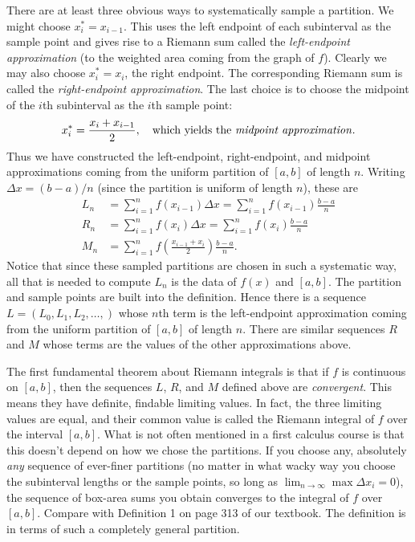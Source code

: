 \documentclass[12pt]{amsart}
\begin{document}
There are at least three obvious ways to systematically sample a partition. We might choose $x^{\ast}_i = x_{i-1}$. This uses the left endpoint of each subinterval as the sample point and gives rise to a Riemann sum called the \emph{left-endpoint approximation} (to the weighted area coming from the graph of $f$). Clearly we may also choose $x^{\ast}_i = x_i$, the right endpoint. The corresponding Riemann sum is called the \emph{right-endpoint approximation}. The last choice is to choose the midpoint of the $i$th subinterval as the $i$th sample point:
\[
x^{\ast}_i = \frac{x_i + x_{i-1}}{2}, \quad \text{which yields the \emph{midpoint approximation}}.
\]
Thus we have constructed the left-endpoint, right-endpoint, and midpoint approximations coming from the uniform partition of $[a,b]$ of length $n$. Writing $\Delta x = (b-a)/n$ (since the partition is uniform of length $n$), these are
\begin{align*}
L_n &= \sum_{i=1}^n f(x_{i-1}) \Delta x = \sum_{i=1}^n f(x_{i-1}) \frac{b-a}{n} \\
R_n &= \sum_{i=1}^n f(x_i) \Delta x = \sum_{i=1}^n f(x_i) \frac{b-a}{n} \\
M_n &= \sum_{i=1}^n f \left( \frac{x_{i-1}+x_i}{2} \right) \frac{b-a}{n}.
\end{align*}
Notice that since these sampled partitions are chosen in such a systematic way, all that is needed to compute $L_n$ is the data of $f(x)$ and $[a,b]$. The partition and sample points are built into the definition. Hence there is a sequence $L = (L_0, L_1, L_2, \ldots, )$ whose $n$th term is the left-endpoint approximation coming from the uniform partition of $[a,b]$ of length $n$. There are similar sequences $R$ and $M$ whose terms are the values of the other approximations above.

The first fundamental theorem about Riemann integrals is that if $f$ is continuous on $[a,b]$, then the sequences $L$, $R$, and $M$ defined above are \emph{convergent}. This means they have definite, findable limiting values. In fact, the three limiting values are equal, and their common value is called the Riemann integral of $f$ over the interval $[a,b]$. What is not often mentioned in a first calculus course is that this doesn't depend on how we chose the partitions. If you choose any, absolutely \emph{any} sequence of ever-finer partitions (no matter in what wacky way you choose the subinterval lengths or the sample points, so long as $\lim_{n \to \infty} \max \Delta x_i = 0$), the sequence of box-area sums you obtain converges to the integral of $f$ over $[a,b]$. Compare with Definition 1 on page 313 of our textbook. The definition is in terms of such a completely general partition.
\end{document}
